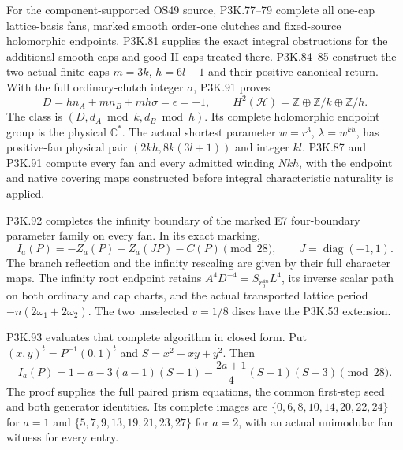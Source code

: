 \begin{theorem}
For the component-supported OS49 source, P3K.77--79 complete all
one-cap lattice-basis fans, marked smooth order-one clutches and
fixed-source holomorphic endpoints. P3K.81 supplies the exact
integral obstructions for the additional smooth caps and good-II
caps treated there. P3K.84--85 construct the two actual finite caps
\(m=3k\), \(h=6l+1\) and their positive canonical return.
With the full ordinary-clutch integer \(\sigma\), P3K.91 proves
\[
 D=hn_A+mn_B+mh\sigma=\epsilon=\pm1,\qquad
 H^2(\mathcal H)=\mathbb Z\oplus\mathbb Z/k\oplus\mathbb Z/h.
\]
The class is \((D,d_A\bmod k,d_B\bmod h)\). Its complete
holomorphic endpoint group is the physical \(\mathbb C^*\).
The actual shortest parameter \(w=r^3\), \(\lambda=w^{kh}\), has
positive-fan physical pair \((2kh,8k(3l+1))\) and integer \(kl\).
P3K.87 and P3K.91 compute every fan and every admitted winding
\(Nkh\), with the endpoint and native covering maps constructed
before integral characteristic naturality is applied.

P3K.92 completes the infinity boundary of the marked E7
four-boundary parameter family on every fan. In its exact marking,
\[
 I_a(P)=-Z_a(P)-Z_a(JP)-C(P)\pmod {28},\qquad
 J=\operatorname{diag}(-1,1).
\]
The branch reflection and the infinity rescaling are given by
their full character maps. The infinity root endpoint retains
\(A^4D^{-4}=S_{r_0^{4n}}L^4\), its inverse scalar path on both
ordinary and cap charts, and the actual transported lattice
period \(-n(2\omega_1+2\omega_2)\). The two unselected
\(v=1/8\) discs have the P3K.53 extension.

P3K.93 evaluates that complete algorithm in closed form. Put
\((x,y)^t=P^{-1}(0,1)^t\) and \(S=x^2+xy+y^2\). Then
\[
 I_a(P)=1-a-3(a-1)(S-1)-\frac{2a+1}{4}(S-1)(S-3)
          \pmod {28}.
\]
The proof supplies the full paired prism equations, the common
first-step seed and both generator identities. Its complete images
are \(\{0,6,8,10,14,20,22,24\}\) for \(a=1\) and
\(\{5,7,9,13,19,21,23,27\}\) for \(a=2\), with an actual
unimodular fan witness for every entry.


\end{theorem}
